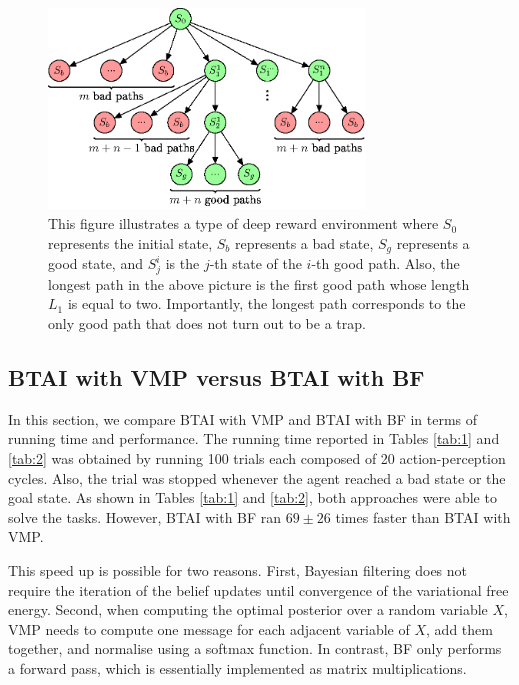 \documentclass[twoside,11pt]{article}
\begin{document}
\begin{figure}[H]
	\begin{center}
	\includegraphics[width=0.75\textwidth]{BTAI_BF-figure1.eps}
 	\end{center}
\vspace{-0.25cm}
    \caption{
This figure illustrates a type of deep reward environment where $S_0$ represents the initial state, $S_b$ represents a bad state, $S_g$ represents a good state, and $S^i_j$ is the $j$-th state of the $i$-th good path. Also, the longest path in the above picture is the first good path whose length $L_1$ is equal to two. Importantly, the longest path corresponds to the only good path that does not turn out to be a trap.}
    \label{fig:graph_env}
\end{figure}

\subsection{BTAI with VMP versus BTAI with BF}

In this section, we compare BTAI with VMP and BTAI with BF in terms of running time and performance. The running time reported in Tables \ref{tab:1} and \ref{tab:2} was obtained by running 100 trials each composed of 20 action-perception cycles. Also, the trial was stopped whenever the agent reached a bad state or the goal state. As shown in Tables \ref{tab:1} and \ref{tab:2}, both approaches were able to solve the tasks. However, BTAI with BF ran $69 \pm 26$ times faster than BTAI with VMP.

This speed up is possible for two reasons. First, Bayesian filtering does not require the iteration of the belief updates until convergence of the variational free energy. Second, when computing the optimal posterior over a random variable $X$, VMP needs to compute one message for each adjacent variable of $X$, add them together, and normalise using a softmax function. In contrast, BF only performs a forward pass, which is essentially implemented as matrix multiplications. 
\end{document}
